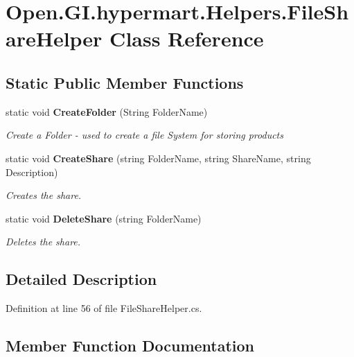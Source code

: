 \section{Open.\+G\+I.\+hypermart.\+Helpers.\+File\+Share\+Helper Class Reference}
\label{class_open_1_1_g_i_1_1hypermart_1_1_helpers_1_1_file_share_helper}


 


\subsection*{Static Public Member Functions}
\begin{DoxyCompactItemize}
\item 
static void \textbf{ Create\+Folder} (String Folder\+Name)
\begin{DoxyCompactList}\small\item\em Create a Folder -\/ used to create a file System for storing products \end{DoxyCompactList}\item 
static void \textbf{ Create\+Share} (string Folder\+Name, string Share\+Name, string Description)
\begin{DoxyCompactList}\small\item\em Creates the share. \end{DoxyCompactList}\item 
static void \textbf{ Delete\+Share} (string Folder\+Name)
\begin{DoxyCompactList}\small\item\em Deletes the share. \end{DoxyCompactList}\end{DoxyCompactItemize}


\subsection{Detailed Description}




Definition at line 56 of file File\+Share\+Helper.\+cs.



\subsection{Member Function Documentation}
\mbox{\label{class_open_1_1_g_i_1_1hypermart_1_1_helpers_1_1_file_share_helper_a8e938d7ae2d931ab892c0ebf964ee4d2}} 

